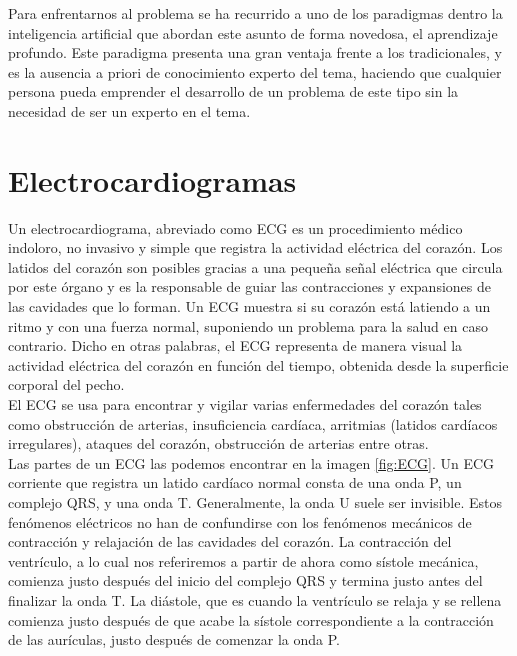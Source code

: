     Para enfrentarnos al problema se ha recurrido a uno de los paradigmas dentro la inteligencia artificial que abordan este asunto de forma novedosa, el aprendizaje profundo. Este paradigma presenta una gran ventaja frente a los tradicionales, y es la ausencia a priori de conocimiento experto del tema, haciendo que cualquier persona pueda emprender el desarrollo de un problema de este tipo sin la necesidad de ser un experto en el tema. \\ 
    


\section{Electrocardiogramas}
    
    
    Un electrocardiograma, abreviado como ECG es un procedimiento médico indoloro, no invasivo y simple que registra la actividad eléctrica del corazón. Los latidos del corazón son posibles gracias a una pequeña señal eléctrica que circula por este órgano y es la responsable de guiar las contracciones y expansiones de las cavidades que lo forman. Un ECG muestra si su corazón está latiendo a un ritmo y con una fuerza normal, suponiendo un problema para la salud en caso contrario. Dicho en otras palabras, el ECG representa de manera visual la actividad eléctrica del corazón en función del tiempo, obtenida desde la superficie corporal del pecho. \\
    
    
    El ECG se usa para encontrar y vigilar varias enfermedades del corazón tales como obstrucción de arterias, insuficiencia cardíaca, arritmias (latidos cardíacos irregulares), ataques del corazón, obstrucción de arterias entre otras. \\
    
    Las partes de un ECG las podemos encontrar en la imagen \ref{fig:ECG}. Un ECG corriente que registra un latido cardíaco normal consta de una onda P, un complejo QRS, y una onda T. Generalmente, la onda U suele ser invisible. Estos fenómenos eléctricos no han de confundirse con los fenómenos mecánicos de contracción y relajación de las cavidades del corazón. La contracción del ventrículo, a lo cual nos referiremos a partir de ahora como sístole mecánica, comienza justo después del inicio del complejo QRS y termina justo antes del finalizar la onda T. La diástole, que es cuando la ventrículo se relaja y se rellena comienza justo después de que acabe la sístole correspondiente a la contracción de las aurículas, justo después de comenzar la onda P. \\
    

